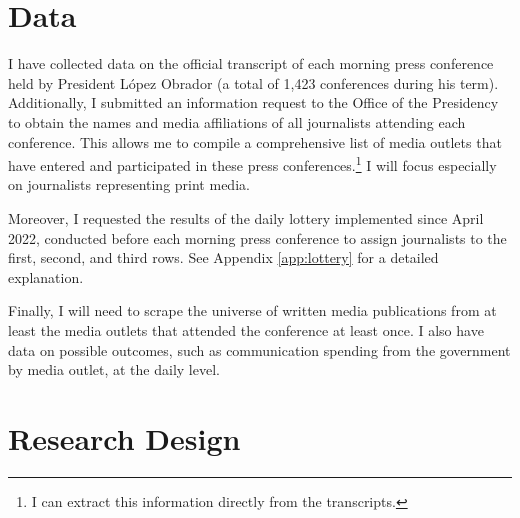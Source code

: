 \documentclass[14]{article}
\begin{document}


\section{Data}

I have collected data on the official transcript of each morning press conference held by President López Obrador (a total of 1,423 conferences during his term). Additionally, I submitted an information request to the Office of the Presidency to obtain the names and media affiliations of all journalists attending each conference. This allows me to compile a comprehensive list of media outlets that have entered and participated in these press conferences.\footnote{I can extract this information directly from the transcripts.} I will focus especially on journalists representing print media.

Moreover, I requested the results of the daily lottery implemented since April 2022, conducted before each morning press conference to assign journalists to the first, second, and third rows. See Appendix \ref{app:lottery} for a detailed explanation. 

Finally, I will need to scrape the universe of written media publications from at least the media outlets that attended the conference at least once. I also have data on possible outcomes, such as communication spending from the government by media outlet, at the daily level.

\section{Research Design}
\end{document}
